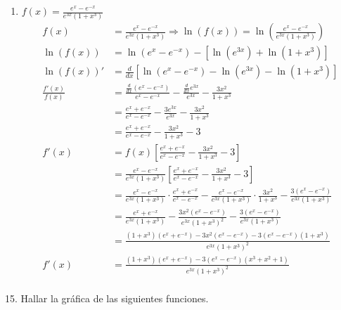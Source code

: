 \documentclass[12pt]{article}
\begin{document}
\begin{enumerate}[\hspace{9px} a)]
    \item \(f(x)=\displaystyle\frac{e^x-e^{-x}}{e^{3x}(1+x^3)}\)\bigskip
        \begin{align*}
            f(x)&=\frac{e^x-e^{-x}}{e^{3x}(1+x^3)} \Longrightarrow \ln(f(x)) = \ln\left(\frac{e^x-e^{-x}}{e^{3x}(1+x^3)}\right)\\
            \ln(f(x))&= \ln(e^x-e^{-x}) - [\ln(e^{3x}) + \ln(1+x^3)]\\
            \ln(f(x))' &= \frac{d}{dx}\left[\ln(e^x-e^{-x}) - \ln(e^{3x}) - \ln(1+x^3)\right]\\
            \frac{f'(x)}{f(x)} &= \frac{\frac{d}{dx}(e^x-e^{-x})}{e^x-e^{-x}} - \frac{\frac{d}{dx}e^{3x}}{e^{3x}} - \frac{3x^2}{1+x^3}\\
            &= \frac{e^x+e^{-x}}{e^x-e^{-x}} - \frac{3e^{3x}}{e^{3x}} - \frac{3x^2}{1+x^3}\\
            &= \frac{e^x+e^{-x}}{e^x-e^{-x}} - \frac{3x^2}{1+x^3} -3\\
            f'(x) &= f(x)\left[\frac{e^x+e^{-x}}{e^x-e^{-x}} - \frac{3x^2}{1+x^3} -3\right]\\
            &= \frac{e^x-e^{-x}}{e^{3x}(1+x^3)}\left[\frac{e^x+e^{-x}}{e^x-e^{-x}} - \frac{3x^2}{1+x^3} -3\right]\\
            &= \frac{e^x-e^{-x}}{e^{3x}(1+x^3)}\cdot\frac{e^x+e^{-x}}{e^x-e^{-x}} -\frac{e^x-e^{-x}}{e^{3x}(1+x^3)}\cdot\frac{3x^2}{1+x^3} -\frac{3(e^x-e^{-x})}{e^{3x}(1+x^3)}\\
            &= \frac{e^x+e^{-x}}{e^{3x}(1+x^3)} - \frac{3x^2(e^x-e^{-x})}{e^{3x}(1+x^3)^2} - \frac{3(e^x-e^{-x})}{e^{3x}(1+x^3)}\\
            &= \frac{(1+x^3)(e^x+e^{-x})-3x^2(e^x-e^{-x})-3(e^x-e^{-x})(1+x^3)}{e^{3x}(1+x^3)^2}\\
            f'(x) &= \frac{(1+x^3)(e^x+e^{-x})-3(e^x-e^{-x})(x^3+x^2+1)}{e^{3x}(1+x^3)^2}\\
        \end{align*}

\end{enumerate}

15. Hallar la gr\'afica de las siguientes funciones.
\end{document}
